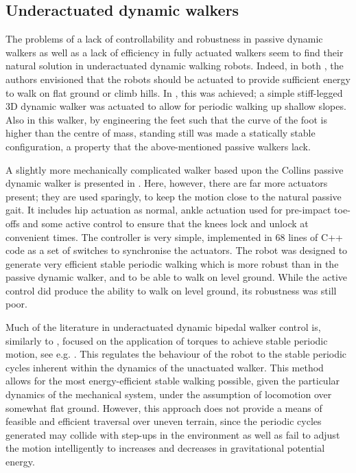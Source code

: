 \subsection{Underactuated dynamic walkers}
The problems of a lack of controllability and robustness in passive dynamic walkers as well as a lack of efficiency in fully actuated walkers seem to find their natural solution in underactuated dynamic  walking robots. Indeed, in both \cite{mcgeer1990passive, collins2001three}, the authors envisioned that the robots should be actuated to provide sufficient energy to walk on flat ground or climb hills. In \cite{tedrake2004actuating}, this was achieved; a simple stiff-legged 3D dynamic walker was actuated to allow for periodic walking up shallow slopes. Also in this walker, by engineering the feet such that the curve of the foot is higher than the centre of mass, standing still was made a statically stable configuration, a property that the above-mentioned passive walkers lack.

A slightly more mechanically complicated walker based upon the Collins passive dynamic walker is presented in \cite{collins2005bipedal}. Here, however, there are far more actuators present; they are used sparingly, to keep the motion close to the natural passive gait. It includes hip actuation as normal, ankle actuation used for pre-impact toe-offs and some active control to ensure that the knees lock and unlock at convenient times. The controller is very simple, implemented in 68 lines of C++ code as a set of switches to synchronise the actuators. The robot was designed to generate very efficient stable periodic walking which is more robust than in the passive dynamic walker, and to be able to walk on level ground. While the active control did produce the ability to walk on level ground, its robustness was still poor.

Much of the literature in underactuated dynamic bipedal walker control is, similarly to \cite{tedrake2004actuating, collins2005bipedal}, focused on the application of torques to achieve stable periodic motion, see e.g. \cite{grizzle2001asymptotically, shiriaev2005constructive, sreenath2011compliant}. This regulates the behaviour of the robot to the stable periodic cycles inherent within the dynamics of the unactuated walker. This method allows for the most energy-efficient stable walking possible, given the particular dynamics of the mechanical system, under the assumption of locomotion over somewhat flat ground. However, this approach does not provide a means of feasible and efficient traversal over uneven terrain, since the periodic cycles generated may collide with step-ups in the environment as well as fail to adjust the motion intelligently to increases and decreases in gravitational potential energy.

